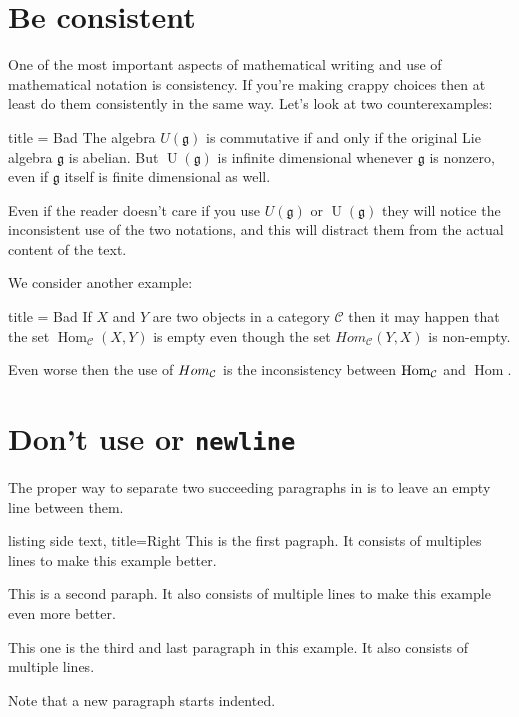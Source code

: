 \documentclass[a4paper, 10pt, headings=standardclasses, oneside, bibliography=totocnumbered]{scrbook}
\begin{document}
\section{Be consistent}

One of the most important aspects of mathematical writing and use of mathematical notation is consistency.
If you’re making crappy choices then at least do them consistently in the same way.
Let’s look at two counterexamples:

\begin{tcblisting}{title = {Bad}}
\newcommand{\glie}{\mathfrak{g}}
The algebra $U(\glie)$ is commutative if and only if the original Lie algebra $\glie$ is abelian.
But $\operatorname{U}(\glie)$ is infinite dimensional whenever $\glie$ is nonzero, even if $\glie$ itself is finite dimensional as well.
\end{tcblisting}
Even if the reader doesn’t care if you use $U(\mathfrak{g})$ or $\operatorname{U}(\mathfrak{g})$ they will notice the inconsistent use of the two notations, and this will distract them from the actual content of the text.

We consider another example:
\begin{tcblisting}{title = {Bad}}
If $X$ and $Y$ are two objects in a category $\mathcal{C}$ then it may happen that the set $\operatorname{Hom}_{\mathcal{C}}(X,Y)$ is empty even though the set $Hom_{\mathcal{C}}(Y,X)$ is non-empty.
\end{tcblisting}
Even worse then the use of $Hom_{\mathcal{C}}$ is the inconsistency between $\operatorname{Hom}_{\mathcal{C}}$ and $\operatorname{Hom}$.






















\section{Don’t use \texttt{\tbs\tbs} or \texttt{{\tbs}newline}}

The proper way to separate two succeeding paragraphs in  is to leave an empty line between them.
\begin{tcblisting}{listing side text, title={Right}}
This is the first pagraph.
It consists of multiples lines to make this example better.

This is a second paraph.
It also consists of multiple lines to make this example even more better.

This one is the third and last paragraph in this example.
It also consists of multiple lines.
\end{tcblisting}
Note that a new paragraph starts indented.
\end{document}
